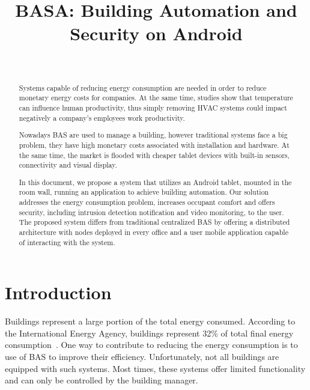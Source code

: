\documentclass[conference]{IEEEtran}
\begin{document}
\title{\LARGE BASA: Building Automation and Security on Android}

\author{
  \\
}


\maketitle

\begin{abstract}
Systems capable of reducing energy consumption are needed in order to reduce monetary energy costs for companies. At the same time, studies show that temperature can influence human productivity, thus simply removing \ac{HVAC} systems could impact negatively a company's employees work productivity.

Nowadays \ac{BAS} are used to manage a building, however traditional systems face a big problem, they have high monetary costs associated with installation and hardware. At the same time, the market is flooded with cheaper tablet devices with built-in sensors, connectivity and visual display.

In this document, we propose a system that utilizes an Android tablet, mounted in the room wall, running an application to achieve building automation. Our solution addresses the energy consumption problem, increases occupant comfort and offers security, including intrusion detection notification and video monitoring, to the user. The proposed system differs from traditional centralized \ac{BAS} by offering a distributed architecture with nodes deployed in every office and a user mobile application capable of interacting with the system.

\end{abstract}

\IEEEpeerreviewmaketitle

\section{Introduction}
\label{introduction}

Buildings represent a large portion of the total energy consumed. According to the International Energy Agency, buildings represent 32\% of total final energy consumption~\cite{iea}. One way to contribute to reducing the energy consumption is to use of \ac{BAS} to improve their efficiency. Unfortunately, not all buildings are equipped with such systems. Most times, these systems offer limited functionality and can only be controlled by the building manager.
\end{document}
